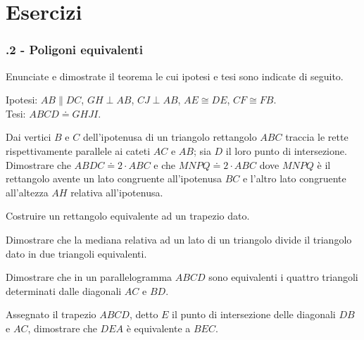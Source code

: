 \section{Esercizi}

\subsubsection*{\thechapter.2 - Poligoni equivalenti}

\begin{multicols}{2}

\begin{esercizio}
\label{ese:7.1}
Enunciate e dimostrate il teorema le cui ipotesi e tesi sono indicate di seguito.

\noindent Ipotesi: $AB\parallel DC$, $GH\perp AB$, $CJ\perp AB$, $AE\cong DE$, $CF\cong FB$.\\
Tesi: $ABCD\doteq GHJI$.
\end{esercizio}
 
\begin{esercizio}
\label{ese:7.2}
Dai vertici $B$ e $C$ dell'ipotenusa di un triangolo rettangolo $ABC$ traccia le rette rispettivamente parallele ai cateti $AC$ e $AB$; sia $D$ il loro punto di intersezione. Dimostrare che $ABDC\doteq 2\cdot ABC$ e che $MNPQ\doteq 2\cdot ABC$ dove $MNPQ$ è il rettangolo avente un lato congruente all'ipotenusa $BC$ e l'altro lato congruente all'altezza $AH$ relativa all'ipotenusa.
\end{esercizio}

\begin{esercizio}
\label{ese:7.3}
Costruire un rettangolo equivalente ad un trapezio dato.
\end{esercizio}

\begin{esercizio}
\label{ese:7.4}
Dimostrare che la mediana relativa ad un lato di un triangolo divide il triangolo dato in due triangoli equivalenti.
\end{esercizio}

\begin{esercizio}
\label{ese:7.5}
Dimostrare che in un parallelogramma $ABCD$ sono equivalenti i quattro triangoli determinati dalle diagonali $AC$ e $BD$.
\end{esercizio}

\begin{esercizio}
\label{ese:7.6}
Assegnato il trapezio $ABCD$, detto $E$ il punto di intersezione delle diagonali $DB$ e $AC$, dimostrare che $DEA$ è equivalente a $BEC$.
\end{esercizio}


\end{multicols}
